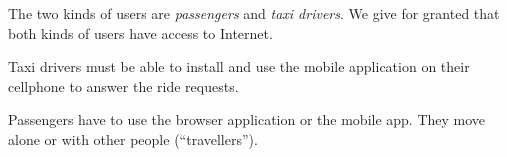 The two kinds of users are \emph{passengers} and \emph{taxi drivers}.
We give for granted that both kinds of users have access to Internet.

Taxi drivers must be able to install and use the mobile application on their cellphone to answer the ride requests.

Passengers have to use the browser application or the mobile app. They move alone or with other people (``travellers'').
